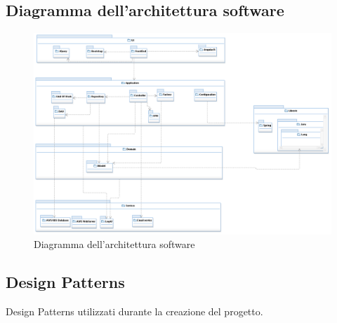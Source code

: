 \documentclass[12pt]{article}
\begin{document}
\subsection{Diagramma dell'architettura software}
\begin{figure}[H]
\centering
\includegraphics[scale=0.5]{UNIMIBModule_LogicalArchitectureDiagram.png}
\caption{Diagramma dell'architettura software}
\end{figure}
\subsection{Design Patterns}
Design Patterns utilizzati durante la creazione del progetto.
\end{document}
